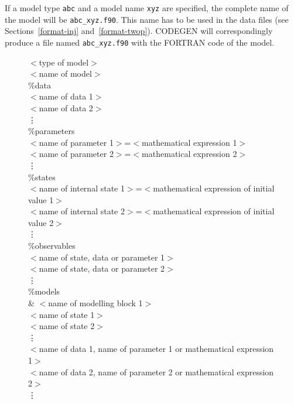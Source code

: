 If a model type {\tt abc} and a model name {\tt xyz} are specified, the complete name of the model will be 
{\tt abc\_xyz.f90}. This name has to be used in the data files (see Sections~\ref{format-inj} and~\ref{format-twop}). CODEGEN will correspondingly produce a file named {\tt abc\_xyz.f90} with the FORTRAN code of the model.

\begin{figure}[h!]
\large
\begin{mdframed}
$<$type of model$>$\\
$<$name of model$>$\\
\%data\\
$<$name of data 1$>$\\
$<$name of data 2$>$\\
\hspace*{5ex}\vdots \\
\%parameters\\
$<$name of parameter 1$>$=$<$mathematical expression 1$>$ \\
$<$name of parameter 2$>$=$<$mathematical expression 2$>$ \\
\hspace*{5ex}\vdots \\
\%states\\
$<$name of internal state 1$>$=$<$mathematical expression of initial value 1$>$ \\
$<$name of internal state 2$>$=$<$mathematical expression of initial value 2$>$ \\
\hspace*{5ex}\vdots \\
\%observables\\
$<$name of state, data or parameter 1$>$ \\
$<$name of state, data or parameter 2$>$ \\
\hspace*{5ex}\vdots \\
\%models\\
\& $<$name of modelling block 1$>$ \\
$<$name of state 1$>$\\
$<$name of state 2$>$\\
\hspace*{5ex}\vdots \\
$<$name of data 1, name of parameter 1 or mathematical expression 1$>$ \\
$<$name of data 2, name of parameter 2 or mathematical expression 2$>$ \\
\hspace*{5ex}\vdots \\

\end{mdframed}
\end{figure}
